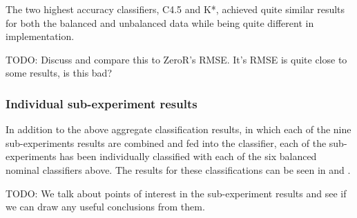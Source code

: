 \documentclass[../thesis/thesis.tex]{subfiles}
\begin{document}
The two highest accuracy classifiers, C4.5 and K*, achieved quite similar results for both the balanced and unbalanced data while being quite different in implementation. %

TODO: Discuss and compare this to ZeroR's RMSE. It's RMSE is quite close to some results, is this bad?

\subsubsection{Individual sub-experiment results}

In addition to the above aggregate classification results, in which each of the nine sub-experiments results are combined and fed into the classifier, each of the sub-experiments has been individually classified with each of the six balanced nominal classifiers above. The results for these classifications can be seen in  and .

TODO: We talk about points of interest in the sub-experiment results and see if we can draw any useful conclusions from them.
\end{document}

